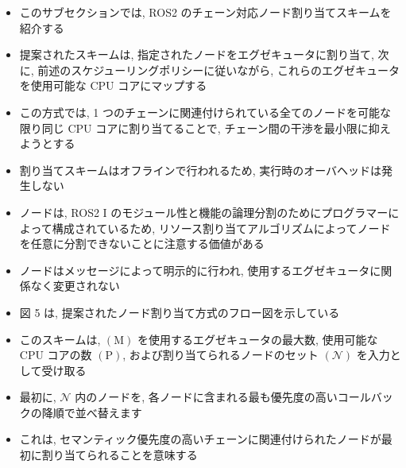 \begin{frame}{}
    \begin{itemize}
        \item このサブセクションでは, ROS2 のチェーン対応ノード割り当てスキームを紹介する
        \item 提案されたスキームは, 指定されたノードをエグゼキュータに割り当て, 次に, 前述のスケジューリングポリシーに従いながら, これらのエグゼキュータを使用可能な CPU コアにマップする
        \item この方式では, 1 つのチェーンに関連付けられている全てのノードを可能な限り同じ CPU コアに割り当てることで, チェーン間の干渉を最小限に抑えようとする
        \item 割り当てスキームはオフラインで行われるため, 実行時のオーバヘッドは発生しない
        \item ノードは, ROS2 I のモジュール性と機能の論理分割のためにプログラマーによって構成されているため, リソース割り当てアルゴリズムによってノードを任意に分割できないことに注意する価値がある
        \item ノードはメッセージによって明示的に行われ, 使用するエグゼキュータに関係なく変更されない
    \end{itemize}
\end{frame}

\begin{frame}{}
    \begin{itemize}
        \item 図 5 は, 提案されたノード割り当て方式のフロー図を示している
        \item このスキームは, $(\mathrm{M})$ を使用するエグゼキュータの最大数, 使用可能な CPU コアの数 $(\mathrm{P})$, および割り当てられるノードのセット $(\mathcal{N})$ を入力として受け取る
        \item 最初に, $\mathcal{N}$ 内のノードを, 各ノードに含まれる最も優先度の高いコールバックの降順で並べ替えます
        \item これは, セマンティック優先度の高いチェーンに関連付けられたノードが最初に割り当てられることを意味する
    \end{itemize}
\end{frame}

